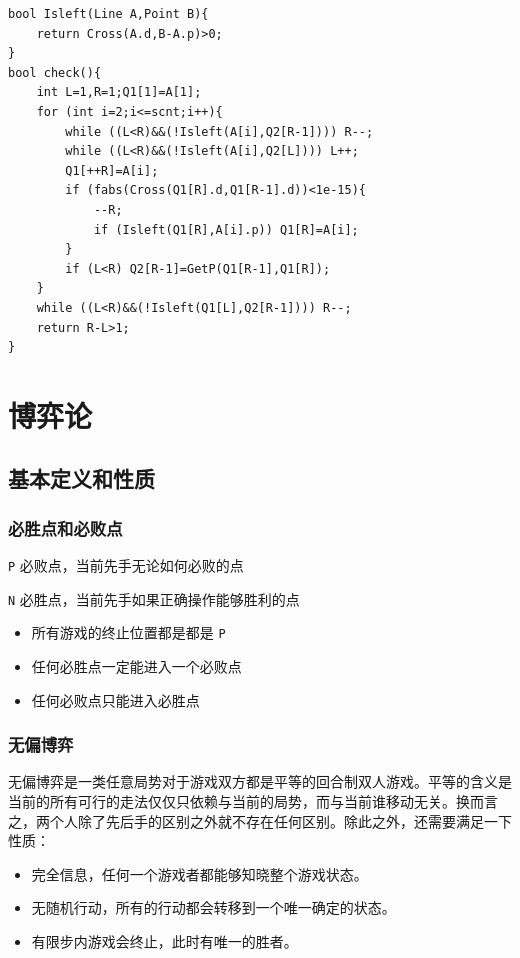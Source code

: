 \documentclass[UTF-8]{ctexart}
\begin{document}
\begin{verbatim}
bool Isleft(Line A,Point B){
    return Cross(A.d,B-A.p)>0;
}
bool check(){
    int L=1,R=1;Q1[1]=A[1];
    for (int i=2;i<=scnt;i++){
        while ((L<R)&&(!Isleft(A[i],Q2[R-1]))) R--;
        while ((L<R)&&(!Isleft(A[i],Q2[L]))) L++;
        Q1[++R]=A[i];
        if (fabs(Cross(Q1[R].d,Q1[R-1].d))<1e-15){
            --R;
            if (Isleft(Q1[R],A[i].p)) Q1[R]=A[i];
        }
        if (L<R) Q2[R-1]=GetP(Q1[R-1],Q1[R]);
    }
    while ((L<R)&&(!Isleft(Q1[L],Q2[R-1]))) R--;
    return R-L>1;
}
\end{verbatim}
\section{博弈论}
	\subsection{基本定义和性质}
	\subsubsection{必胜点和必败点}
	
	\texttt{P} 必败点，当前先手无论如何必败的点  
	
	\texttt{N} 必胜点，当前先手如果正确操作能够胜利的点
	
	\begin{itemize}
		\item 所有游戏的终止位置都是都是 \texttt{P}   
		\item 任何必胜点一定能进入一个必败点  
		\item 任何必败点只能进入必胜点
	\end{itemize}
	
	\subsubsection{无偏博弈}
	
	无偏博弈是一类任意局势对于游戏双方都是平等的回合制双人游戏。平等的含义是当前的所有可行的走法仅仅只依赖与当前的局势，而与当前谁移动无关。换而言之，两个人除了先后手的区别之外就不存在任何区别。除此之外，还需要满足一下性质：  
	
	\begin{itemize}
		\item 完全信息，任何一个游戏者都能够知晓整个游戏状态。  
		\item 无随机行动，所有的行动都会转移到一个唯一确定的状态。  
		\item 有限步内游戏会终止，此时有唯一的胜者。
	\end{itemize}
	
\end{document}
